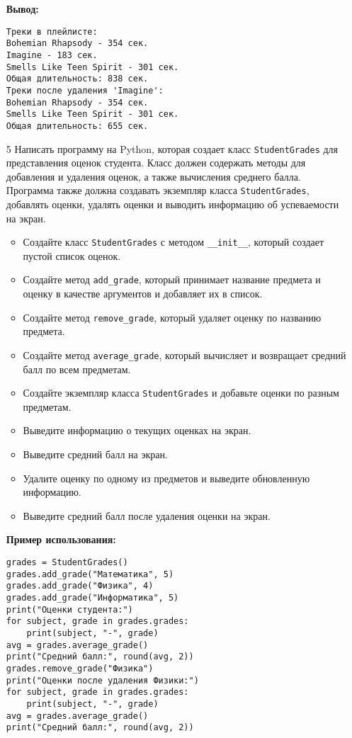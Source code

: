 \begin{enumerate}
\textbf{Вывод:}
\begin{verbatim}
Треки в плейлисте:
Bohemian Rhapsody - 354 сек.
Imagine - 183 сек.
Smells Like Teen Spirit - 301 сек.
Общая длительность: 838 сек.
Треки после удаления 'Imagine':
Bohemian Rhapsody - 354 сек.
Smells Like Teen Spirit - 301 сек.
Общая длительность: 655 сек.
\end{verbatim}

\item[5] Написать программу на Python, которая создает класс \texttt{StudentGrades} для представления оценок студента. Класс должен содержать методы для добавления и удаления оценок, а также вычисления среднего балла. Программа также должна создавать экземпляр класса \texttt{StudentGrades}, добавлять оценки, удалять оценки и выводить информацию об успеваемости на экран.

\begin{itemize}
    \item Создайте класс \texttt{StudentGrades} с методом \texttt{\_\_init\_\_}, который создает пустой список оценок.
    \item Создайте метод \texttt{add\_grade}, который принимает название предмета и оценку в качестве аргументов и добавляет их в список.
    \item Создайте метод \texttt{remove\_grade}, который удаляет оценку по названию предмета.
    \item Создайте метод \texttt{average\_grade}, который вычисляет и возвращает средний балл по всем предметам.
    \item Создайте экземпляр класса \texttt{StudentGrades} и добавьте оценки по разным предметам.
    \item Выведите информацию о текущих оценках на экран.
    \item Выведите средний балл на экран.
    \item Удалите оценку по одному из предметов и выведите обновленную информацию.
    \item Выведите средний балл после удаления оценки на экран.
\end{itemize}

\textbf{Пример использования:}

\begin{verbatim}
grades = StudentGrades()
grades.add_grade("Математика", 5)
grades.add_grade("Физика", 4)
grades.add_grade("Информатика", 5)
print("Оценки студента:")
for subject, grade in grades.grades:
    print(subject, "-", grade)
avg = grades.average_grade()
print("Средний балл:", round(avg, 2))
grades.remove_grade("Физика")
print("Оценки после удаления Физики:")
for subject, grade in grades.grades:
    print(subject, "-", grade)
avg = grades.average_grade()
print("Средний балл:", round(avg, 2))
\end{verbatim}


\end{enumerate}
